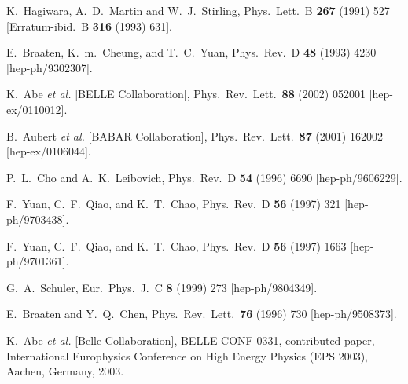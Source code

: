\begin{thebibliography}{999}
K.~Hagiwara, A.~D.~Martin and W.~J.~Stirling,
Phys.\ Lett.\ B {\bf 267} (1991) 527
[Erratum-ibid.\ B {\bf 316} (1993) 631].

E.~Braaten, K.~m.~Cheung, and T.~C.~Yuan,
Phys.\ Rev.\ D {\bf 48} (1993) 4230
[hep-ph/9302307].


K.~Abe {\it et al.}  [BELLE Collaboration],
Phys.\ Rev.\ Lett.\  {\bf 88} (2002) 052001
[hep-ex/0110012].

B.~Aubert {\it et al.}  [BABAR Collaboration],
Phys.\ Rev.\ Lett.\  {\bf 87} (2001) 162002
[hep-ex/0106044].

P.~L.~Cho and A.~K.~Leibovich,
Phys.\ Rev.\ D {\bf 54} (1996) 6690
[hep-ph/9606229].

F.~Yuan, C.~F.~Qiao, and K.~T.~Chao,
Phys.\ Rev.\ D {\bf 56} (1997) 321
[hep-ph/9703438].

F.~Yuan, C.~F.~Qiao, and K.~T.~Chao,
Phys.\ Rev.\ D {\bf 56} (1997) 1663
[hep-ph/9701361].

G.~A.~Schuler,
Eur.\ Phys.\ J.\ C {\bf 8} (1999) 273
[hep-ph/9804349].

E.~Braaten and Y.~Q.~Chen,
Phys.\ Rev.\ Lett.\  {\bf 76} (1996) 730
[hep-ph/9508373].

K.~Abe {\it et al.}  [Belle Collaboration], BELLE-CONF-0331, contributed
paper, International Europhysics Conference on High Energy Physics
(EPS 2003), Aachen, Germany, 2003.


\end{thebibliography}
